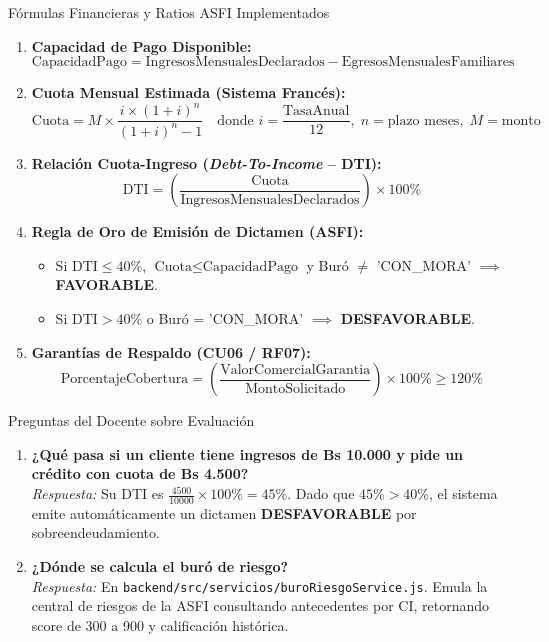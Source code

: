 \documentclass[11pt,letterpaper]{article}
\begin{document}
\begin{formulabox}{Fórmulas Financieras y Ratios ASFI Implementados}
\begin{enumerate}
    \item \textbf{Capacidad de Pago Disponible:}
    $$\text{CapacidadPago} = \text{IngresosMensualesDeclarados} - \text{EgresosMensualesFamiliares}$$
    \item \textbf{Cuota Mensual Estimada (Sistema Francés):}
    $$\text{Cuota} = M \times \frac{i \times (1+i)^n}{(1+i)^n - 1} \quad \text{donde } i = \frac{\text{TasaAnual}}{12}, \; n = \text{plazo meses}, \; M = \text{monto}$$
    \item \textbf{Relación Cuota-Ingreso (\textit{Debt-To-Income} -- DTI):}
    $$\text{DTI} = \left( \frac{\text{Cuota}}{\text{IngresosMensualesDeclarados}} \right) \times 100\%$$
    \item \textbf{Regla de Oro de Emisión de Dictamen (ASFI):}
    \begin{itemize}
        \item Si $\text{DTI} \le 40\%$, $\text{Cuota} \le \text{CapacidadPago}$ y Buró $\ne$ 'CON\_MORA' $\implies$ \textbf{FAVORABLE}.
        \item Si $\text{DTI} > 40\%$ o Buró = 'CON\_MORA' $\implies$ \textbf{DESFAVORABLE}.
    \end{itemize}
    \item \textbf{Garantías de Respaldo (CU06 / RF07):}
    $$\text{PorcentajeCobertura} = \left( \frac{\text{ValorComercialGarantia}}{\text{MontoSolicitado}} \right) \times 100\% \ge 120\%$$
\end{enumerate}
\end{formulabox}

\begin{preguntatrampabox}{Preguntas del Docente sobre Evaluación}
\begin{enumerate}
    \item \textbf{¿Qué pasa si un cliente tiene ingresos de Bs 10.000 y pide un crédito con cuota de Bs 4.500?}\\
    \textit{Respuesta:} Su DTI es $\frac{4500}{10000} \times 100\% = 45\%$. Dado que $45\% > 40\%$, el sistema emite automáticamente un dictamen \textbf{DESFAVORABLE} por sobreendeudamiento.
    \item \textbf{¿Dónde se calcula el buró de riesgo?}\\
    \textit{Respuesta:} En \texttt{backend/src/servicios/buroRiesgoService.js}. Emula la central de riesgos de la ASFI consultando antecedentes por CI, retornando score de 300 a 900 y calificación histórica.
\end{enumerate}
\end{preguntatrampabox}
\end{document}
